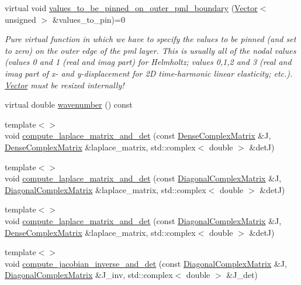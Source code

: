 \begin{DoxyCompactItemize}
\item 
virtual void \hyperlink{classoomph_1_1PMLElementBase_ad63639f1966cd3191fad69852732fd90}{values\+\_\+to\+\_\+be\+\_\+pinned\+\_\+on\+\_\+outer\+\_\+pml\+\_\+boundary} (\hyperlink{classoomph_1_1Vector}{Vector}$<$ unsigned $>$ \&values\+\_\+to\+\_\+pin)=0
\begin{DoxyCompactList}\small\item\em Pure virtual function in which we have to specify the values to be pinned (and set to zero) on the outer edge of the pml layer. This is usually all of the nodal values (values 0 and 1 (real and imag part) for Helmholtz; values 0,1,2 and 3 (real and imag part of x-\/ and y-\/displacement for 2D time-\/harmonic linear elasticity; etc.). \hyperlink{classoomph_1_1Vector}{Vector} must be resized internally! \end{DoxyCompactList}\item 
virtual double \hyperlink{classoomph_1_1PMLElementBase_aa5b90942c96259fd87804d5967f0b2ee}{wavenumber} () const
\item 
{\footnotesize template$<$$>$ }\\void \hyperlink{classoomph_1_1PMLElementBase_a3da41e68b3381bd895cbbb91a0e79d6a}{compute\+\_\+laplace\+\_\+matrix\+\_\+and\+\_\+det} (const \hyperlink{classoomph_1_1DenseComplexMatrix}{Dense\+Complex\+Matrix} \&J, \hyperlink{classoomph_1_1DenseComplexMatrix}{Dense\+Complex\+Matrix} \&laplace\+\_\+matrix, std\+::complex$<$ double $>$ \&detJ)
\item 
{\footnotesize template$<$$>$ }\\void \hyperlink{classoomph_1_1PMLElementBase_a0c7fdbbfd51a1929c75ff20747950381}{compute\+\_\+laplace\+\_\+matrix\+\_\+and\+\_\+det} (const \hyperlink{classoomph_1_1DiagonalComplexMatrix}{Diagonal\+Complex\+Matrix} \&J, \hyperlink{classoomph_1_1DiagonalComplexMatrix}{Diagonal\+Complex\+Matrix} \&laplace\+\_\+matrix, std\+::complex$<$ double $>$ \&detJ)
\item 
{\footnotesize template$<$$>$ }\\void \hyperlink{classoomph_1_1PMLElementBase_aa6ad768c2e09a73f5b47ef6ddd58243a}{compute\+\_\+laplace\+\_\+matrix\+\_\+and\+\_\+det} (const \hyperlink{classoomph_1_1DiagonalComplexMatrix}{Diagonal\+Complex\+Matrix} \&J, \hyperlink{classoomph_1_1DenseComplexMatrix}{Dense\+Complex\+Matrix} \&laplace\+\_\+matrix, std\+::complex$<$ double $>$ \&detJ)
\item 
{\footnotesize template$<$$>$ }\\void \hyperlink{classoomph_1_1PMLElementBase_a6ce32a5723dadf4c7274ffcaf6f2f646}{compute\+\_\+jacobian\+\_\+inverse\+\_\+and\+\_\+det} (const \hyperlink{classoomph_1_1DiagonalComplexMatrix}{Diagonal\+Complex\+Matrix} \&J, \hyperlink{classoomph_1_1DiagonalComplexMatrix}{Diagonal\+Complex\+Matrix} \&J\+\_\+inv, std\+::complex$<$ double $>$ \&J\+\_\+det)

\end{DoxyCompactItemize}
